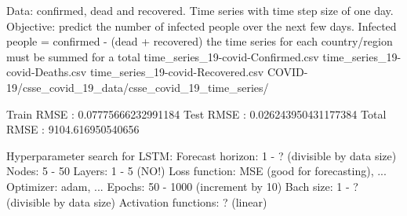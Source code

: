 Data: confirmed, dead and recovered. Time series with time step size of one day.
Objective: predict the number of infected people over the next few days.
Infected people = confirmed - (dead + recovered) {the time series for each country/region must be summed for a total}
time_series_19-covid-Confirmed.csv  time_series_19-covid-Deaths.csv  time_series_19-covid-Recovered.csv 
COVID-19/csse_covid_19_data/csse_covid_19_time_series/

Train RMSE : 0.07775666232991184
Test RMSE : 0.026243950431177384
Total RMSE : 9104.616950540656


Hyperparameter search for LSTM:
Forecast horizon: 1 - ? (divisible by data size)
Nodes: 5 - 50
Layers: 1 - 5 (NO!)
Loss function: MSE (good for forecasting), ...
Optimizer: adam, ...
Epochs: 50 - 1000 (increment by 10)
Bach size: 1 - ? (divisible by data size)
Activation functions: ? (linear)
